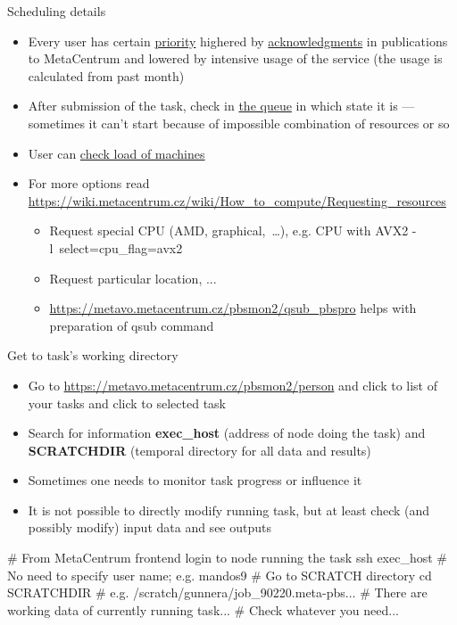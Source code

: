 \documentclass[compress, ucs, xelatex, 11pt, xcolor=x11names, aspectratio=169,
	hyperref={
		bookmarks=true,
		unicode=true,
		colorlinks=true,
		pdftitle={HybSeq course},
		plainpages=false,
		pdfauthor={Vojtech Zeisek},
		pdfsubject={Practical processing of HybSeq target enrichment sequencing data on computing grids like MetaCentrum},
		pdfcreator={XeLaTeX},
		pdfkeywords={BASH, command line, GNU, HybSeq, Linux, MetaCentrum, sequencing shell, target enrichment},
		linkcolor=Cyan2, %
		anchorcolor=Firebrick2, %
		citecolor=Firebrick2, %
		filecolor=Firebrick2, %
		menucolor=Firebrick2, %
		urlcolor=Chartreuse2, %
		pdftex},
	url={hyphens, lowtilde} %
	]{beamer}
\renewcommand{\texttt}[1]{\colorbox{Snow4}{{\ttfamily #1}}}
\begin{document}
\begin{frame}[allowframebreaks]{Scheduling details}
\begin{itemize}
		\item Every user has certain \href{https://metavo.metacentrum.cz/pbsmon2/users/}{priority} highered by \href{https://wiki.metacentrum.cz/wiki/Usage_rules/Acknowledgement}{acknowledgments} in publications to MetaCentrum and lowered by intensive usage of the service (the usage is calculated from past month)
		\item After submission of the task, check in \href{https://metavo.metacentrum.cz/pbsmon2/queues/jobsQueued}{the queue} in which state it is --- sometimes it can't start because of impossible combination of resources or so
		\item User can \href{https://metavo.metacentrum.cz/pbsmon2/nodes/physical}{check load of machines}
		\item For more options read \url{https://wiki.metacentrum.cz/wiki/How_to_compute/Requesting_resources}
		\begin{itemize}
			\item Request special CPU (AMD, graphical,~\ldots), e.g. CPU with AVX2 \texttt{-l~select=cpu\_flag=avx2}
			\item Request particular location, ...
			\item \url{https://metavo.metacentrum.cz/pbsmon2/qsub_pbspro} helps with preparation of \texttt{qsub} command
		\end{itemize}
	\end{itemize}
\end{frame}

\begin{frame}[fragile]{Get to task's working directory}
	\begin{itemize}
		\item Go to \url{https://metavo.metacentrum.cz/pbsmon2/person} and click to list of your tasks and click to selected task
		\item Search for information \textbf{exec\_host} (address of node doing the task) and \textbf{SCRATCHDIR} (temporal directory for all data and results)
		\item Sometimes one needs to monitor task progress or influence it
		\item It is not possible to directly modify running task, but at least check (and possibly modify) input data and see outputs
	\end{itemize}
	\begin{bashcode}
    # From MetaCentrum frontend login to node running the task
    ssh exec_host # No need to specify user name; e.g. mandos9
    # Go to SCRATCH directory
    cd SCRATCHDIR # e.g. /scratch/gunnera/job_90220.meta-pbs...
    # There are working data of currently running task...
    # Check whatever you need...
	\end{bashcode}
\end{frame}
\end{document}

